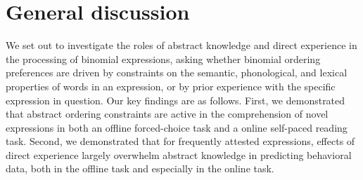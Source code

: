 \documentclass[authoryear]{elsarticle}
\begin{document}
%


\section{General discussion}\label{discussion}

We set out to investigate the roles of abstract knowledge and direct experience in the processing of binomial expressions, asking whether binomial ordering preferences are driven by constraints on the semantic, phonological, and lexical properties of words in an expression, or by prior experience with the specific expression in question. Our key findings are as follows. First, we demonstrated that abstract ordering constraints are active in the comprehension of novel expressions in both an offline forced-choice task and a online self-paced reading task. Second, we demonstrated that for frequently attested expressions, effects of direct experience largely overwhelm abstract knowledge in predicting behavioral data, both in the offline task and especially in the online task.
\end{document}
